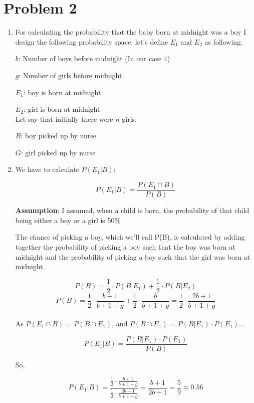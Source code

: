 	\section*{Problem 2}\label{sec:prob-2}
	\begin{enumerate}
	\item For calculating the probability that the baby born at midnight was a boy I design the following probability space:
	 let's define $ E_{1} $ and $ E_{2} $ as following:
	 
	 $ b $: Number of boys before midnight (In our case 4)
	 
	 $ g $: Number of girls before midnight
	 
	 $ E_{1} $: boy is born at midnight
	 
	 $ E_{2} $: girl is born at midnight\\
	
	Let say that initially there were $ n $ girls.
	
	$ B $: boy picked up by nurse
	
	$ G $: girl picked up by nurse\\
	
	\item We have to calculate $ P(E_{1}|B) $:
	
	\[
	P(E_{1}|B) = \frac{P(E_{1} \cap B)}{P(B)}
	\]
	
	\textbf{Assumption}: I assumed, when a child is born, the probability of that child being either a boy or a girl is 50\%
	
	The chance of picking a boy, which we'll call P(B), is calculated by adding together the probability of picking a boy such that the boy was born at midnight and the probability of picking a boy such that the girl was born at midnight.
	
	\[
	P(B) = \frac{1}{2} \cdot P(B|E_{1}) + \frac{1}{2} \cdot P(B|E_{2}) 
	\]
	\[
	P(B) = \frac{1}{2} \cdot \frac{b + 1}{b + 1 + g} + \frac{1}{2} \cdot \frac{b}{b + 1 + g} = \frac{1}{2} \cdot \frac{2b + 1}{b + 1 + g}
	\]\\
	
	As $ P(E_{1} \cap B) $ = $ P(B \cap E_{1}) $, and  $ P(B \cap E_{1}) $ = $ P(B | E_{1}) \cdot  P(E_{1}) \dots$
	
	\[
	P(E_{1}|B) = \frac{P(B | E_{1}) \cdot  P(E_{1})}{P(B)}
	\]
	
	So,
	
	\[
	P(E_{1}|B) = \frac{\frac{1}{2} \cdot \frac{b + 1}{b + 1 + g}}{\frac{1}{2} \cdot \frac{2b + 1}{b + 1 + g}} = \frac{b + 1}{2b + 1} = \frac{5}{9} \approx 0.56
	\]
	
	\end{enumerate}

